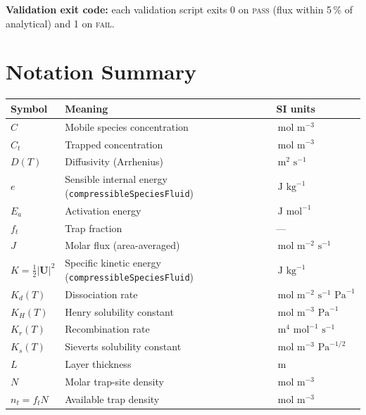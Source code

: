 \documentclass[11pt,a4paper]{article}
\newcommand{\mol}{\,\text{mol}}
\newcommand{\m}{\,\text{m}}
\newcommand{\s}{\,\text{s}}
\newcommand{\Pa}{\,\text{Pa}}
\newcommand{\J}{\,\text{J}}
\newcommand{\kg}{\,\text{kg}}
\begin{document}
\textbf{Validation exit code:} each validation script exits 0 on
\textsc{pass} (flux within 5\,\% of analytical) and 1 on \textsc{fail}.


\newpage
\section{Notation Summary}
\label{sec:notation}

\begin{center}
\begin{tabular}{lll}
\toprule
Symbol & Meaning & SI units \\
\midrule
$C$               & Mobile species concentration       & $\mol\,\m^{-3}$ \\
$C_t$             & Trapped concentration               & $\mol\,\m^{-3}$ \\
$D(T)$            & Diffusivity (Arrhenius)              & $\m^2\,\s^{-1}$ \\
$e$               & Sensible internal energy (\texttt{compressibleSpeciesFluid}) & $\J\,\kg^{-1}$ \\
$E_a$             & Activation energy                   & $\J\,\mol^{-1}$ \\
$f_t$             & Trap fraction                        & --- \\
$J$               & Molar flux (area-averaged)           & $\mol\,\m^{-2}\,\s^{-1}$ \\
$K = \tfrac{1}{2}|\mathbf{U}|^2$ & Specific kinetic energy (\texttt{compressibleSpeciesFluid}) & $\J\,\kg^{-1}$ \\
$K_d(T)$          & Dissociation rate                   & $\mol\,\m^{-2}\,\s^{-1}\,\Pa^{-1}$ \\
$K_H(T)$          & Henry solubility constant            & $\mol\,\m^{-3}\,\Pa^{-1}$ \\
$K_r(T)$          & Recombination rate                  & $\m^4\,\mol^{-1}\,\s^{-1}$ \\
$K_s(T)$          & Sieverts solubility constant         & $\mol\,\m^{-3}\,\Pa^{-1/2}$ \\
$L$               & Layer thickness                      & $\m$ \\
$N$               & Molar trap-site density              & $\mol\,\m^{-3}$ \\
$n_t = f_t N$     & Available trap density               & $\mol\,\m^{-3}$ \\

\end{tabular}
\end{center}
\end{document}
